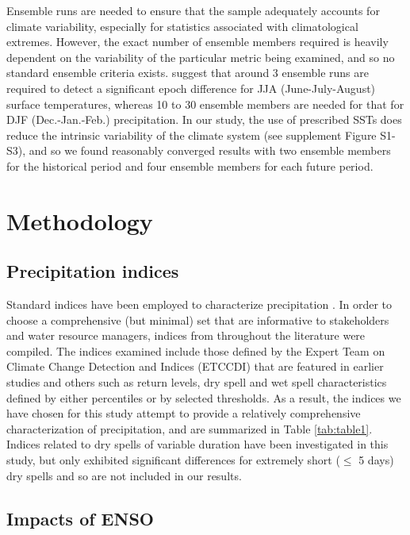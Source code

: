 \documentclass{ametsoc}
\begin{document}
Ensemble runs are needed to ensure that the sample adequately accounts for climate variability, especially for statistics associated with climatological extremes. However, the exact number of ensemble members required is heavily dependent on the variability of the particular metric being examined, and so no standard ensemble criteria exists. \cite{deser2012uncertainty} suggest that around 3 ensemble runs are required to detect a significant epoch difference for JJA (June-July-August) surface temperatures, whereas 10 to 30 ensemble members are needed for that for DJF (Dec.-Jan.-Feb.) precipitation. In our study, the use of prescribed SSTs does reduce the intrinsic variability of the climate system (see supplement Figure S1-S3), and so we found reasonably converged results with two ensemble members for the historical period and four ensemble members for each future period.


\section{Methodology} \label{sec:Methodology}

\subsection{Precipitation indices}

Standard indices have been employed to characterize precipitation \citep{tebaldi2006going, zhang2011indices, sillmann2013climate}. In order to choose a comprehensive (but minimal) set that are informative to stakeholders and water resource managers, indices from throughout the literature were compiled.  The indices examined include those defined by the Expert Team on Climate Change Detection and Indices (ETCCDI) \citep{karl1999clivar} that are featured in earlier studies \citep{duliere2011extreme, sillmann2013climate, diffenbaugh2005fine, singh2013precipitation} and others such as return levels, dry spell and wet spell characteristics defined by either percentiles or by selected thresholds. As a result, the indices we have chosen for this study attempt to provide a relatively comprehensive characterization of precipitation, and are summarized in Table \ref{tab:table1}. Indices related to dry spells of variable duration have been investigated in this study, but only exhibited significant differences for extremely short ($\leq$ 5 days) dry spells and so are not included in our results.


\subsection{Impacts of ENSO}
\end{document}
